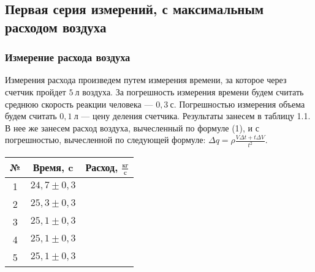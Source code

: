 \documentclass[a4paper,11pt]{article}
\begin{document}
\subsection{Первая серия измерений, с максимальным расходом воздуха}
\subsubsection{Измерение расхода воздуха}
Измерения расхода произведем путем измерения времени, за которое через счетчик пройдет $5\ л$ воздуха.\newline
За погрешность измерения времени будем считать среднюю скорость реакции человека — $0,3\ с$.\newline
Погрешностью измерения объема будем считать $0,1\ л$ — цену деления счетчика.\newline
Результаты занесем в таблицу 1.1.\newline
В нее же занесем расход воздуха, вычесленный по формуле (1), и с погрешностью, вычесленной по следующей формуле: $\Delta q = \rho \frac{V \Delta t + t \Delta V}{t^{2}}$.\newline
\begin{center}
\begin{tabular}{ |c|c|c| }
 \hline
 № & Время, c & Расход, $\frac{кг}{с}$ \\
 \hline
 1 & $24,7 \pm 0,3$ &  \\
 2 & $25,3 \pm 0,3$ &  \\
 3 & $25,1 \pm 0,3$ &  \\
 4 & $25,1 \pm 0,3$ &  \\
 5 & $25,1 \pm 0,3$ &  \\
 \hline
\end{tabular}
\end{center}
\end{document}
